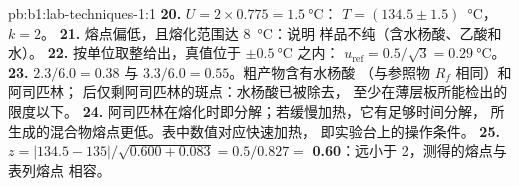 \begin{solution}{pb:b1:lab-techniques-1:1}
\textbf{20.} $U = 2 \times 0.775 = \qty{1.5}{\celsius}$：
$T = (134.5 \pm 1.5)$~\unit{\celsius}，$k = 2$。
\textbf{21.} 熔点偏低，且熔化范围达 \qty{8}{\celsius}：说明
样品不纯（含水杨酸、乙酸和水）。
\textbf{22.} 按单位取整给出，真值位于 $\pm\qty{0.5}{\celsius}$ 之内：
$u_{\mathrm{ref}} = 0.5/\sqrt3 = \qty{0.29}{\celsius}$。
\textbf{23.} $2.3/6.0 = 0.38$ 与 $3.3/6.0 = 0.55$。粗产物含有水杨酸
（与参照物 $R_f$ 相同）和阿司匹林；
后仅剩阿司匹林的斑点：水杨酸已被除去，
至少在薄层板所能检出的限度以下。
\textbf{24.} 阿司匹林在熔化时即分解；若缓慢加热，它有足够时间分解，
所生成的混合物熔点更低。表中数值对应快速加热，
即实验台上的操作条件。
\textbf{25.} $z = |134.5 - 135|/\sqrt{0.600 + 0.083} = 0.5/0.827 =$
\textbf{0.60}：远小于 2，测得的熔点与表列熔点
相容。
\end{solution}
